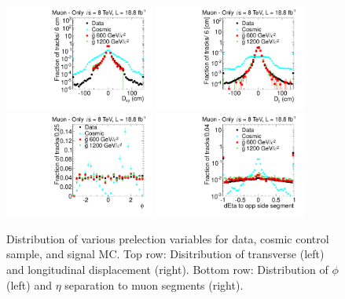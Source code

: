 \begin{figure}
\centering
  \includegraphics[clip=true, trim=0.0cm 0cm 2.8cm 0cm, width=0.44\textwidth]{figures/muonly/Selection_Comp_8TeV_Cosmic_Dxy_BS}
  \includegraphics[clip=true, trim=0.0cm 0cm 2.8cm 0cm, width=0.44\textwidth]{figures/muonly/Selection_Comp_8TeV_Cosmic_Dz_BS} \\
  \includegraphics[clip=true, trim=0.0cm 0cm 2.8cm 0cm, width=0.44\textwidth]{figures/muonly/Selection_Comp_8TeV_Cosmic_Phi_BS}
  \includegraphics[clip=true, trim=0.0cm 0cm 2.8cm 0cm, width=0.44\textwidth]{figures/muonly/Selection_Comp_8TeV_Cosmic_SegMinEtaSep_BS}
  \caption{Distribution of various prelection variables for data, cosmic control sample, and signal MC.
Top row: Disitribution of transverse (left) and longitudinal displacement (right).
Bottom row: Distribution of $\phi$ (left) and $\eta$ separation to muon segments (right).
    \label{fig:MuOnlyPreselB}}
\end{figure}


